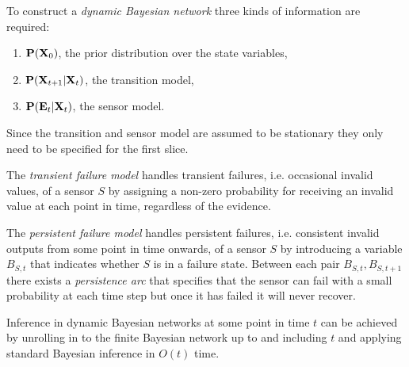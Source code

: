 \documentclass{article}
\begin{document}
\begin{definition}[R\&N p. 591]
    To construct a \emph{dynamic Bayesian network} three kinds of information
    are required:
    \begin{enumerate}
        \item $\P(\vec X_0)$, the prior distribution over the state variables,
        \item $\P(\vec X_{t+1}|\vec X_t)$, the transition model,
        \item $\P(\vec E_t | \vec X_t)$, the sensor model.
    \end{enumerate}
    Since the transition and sensor model are assumed to be stationary they only
    need to be specified for the first slice.
\end{definition}

\begin{definition}[R\&N p. 593]
    The \emph{transient failure model} handles transient failures, i.e. occasional invalid
    values, of a sensor $S$ by assigning a non-zero probability for receiving an invalid
    value at each point in time, regardless of the evidence.
\end{definition}

\begin{definition}
    The \emph{persistent failure model} handles persistent failures, i.e. consistent invalid
    outputs from some point in time onwards, of a sensor $S$ by introducing
    a variable $B_{S,t}$ that indicates whether $S$ is in a failure state. Between each pair
    $B_{S,t}, B_{S,t+1}$ there exists a \emph{persistence arc} that specifies that the sensor can
    fail with a small probability at each time step but once  it has failed it will never recover.
\end{definition}

\begin{theorem}[R\&N p. 595]
    Inference in dynamic Bayesian networks at some point in time $t$ can be achieved by unrolling
    in to the finite Bayesian network up to and including $t$ and applying standard Bayesian
    inference in $O(t)$ time.
\end{theorem}
\end{document}
